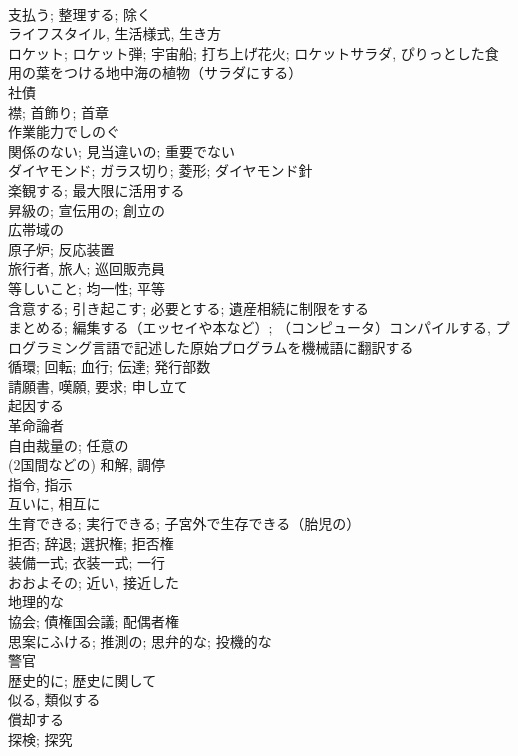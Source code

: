 \documentclass[8pt]{extreport}
\begin{document}
\begin{CJK}{UTF8}{min}
\\	支払う; 整理する; 除く	
\\	ライフスタイル, 生活様式, 生き方	
\\	ロケット; ロケット弾; 宇宙船; 打ち上げ花火; ロケットサラダ, ぴりっとした食用の葉をつける地中海の植物（サラダにする）	
\\	社債	
\\	襟; 首飾り; 首章	
\\	作業能力でしのぐ	
\\	関係のない; 見当違いの; 重要でない	
\\	ダイヤモンド; ガラス切り; 菱形; ダイヤモンド針	
\\	楽観する; 最大限に活用する	
\\	昇級の; 宣伝用の; 創立の	
\\	広帯域の	
\\	原子炉; 反応装置	
\\	旅行者, 旅人; 巡回販売員	
\\	等しいこと; 均一性; 平等	
\\	含意する; 引き起こす; 必要とする; 遺産相続に制限をする	
\\	まとめる; 編集する（エッセイや本など）; （コンピュータ）コンパイルする, プログラミング言語で記述した原始プログラムを機械語に翻訳する	
\\	循環; 回転; 血行; 伝達; 発行部数	
\\	請願書, 嘆願, 要求; 申し立て	
\\	起因する	
\\	革命論者	
\\	自由裁量の; 任意の	
\\	(2国間などの) 和解, 調停	
\\	指令, 指示	
\\	互いに, 相互に	
\\	生育できる; 実行できる; 子宮外で生存できる（胎児の）	
\\	拒否; 辞退; 選択権; 拒否権	
\\	装備一式; 衣装一式; 一行	
\\	おおよその; 近い, 接近した	
\\	地理的な	
\\	協会; 債権国会議; 配偶者権	
\\	思案にふける; 推測の; 思弁的な; 投機的な	
\\	警官	
\\	歴史的に; 歴史に関して	
\\	似る, 類似する	
\\	償却する	
\\	探検; 探究	

\end{CJK}
\end{document}
